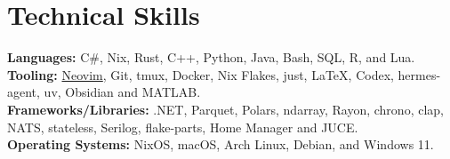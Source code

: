 \section{Technical Skills}
\begin{itemize}[leftmargin=0.15in, label={}]
    \normalsize{
    \item{
        \textbf{Languages: }{C\#, Nix, Rust, C++, Python, Java, Bash,
        SQL, R, and Lua.} \\
        \textbf{Tooling: }{\href{https://github.com/9Prestidigitator/nvim}{Neovim}, Git, tmux, Docker, Nix Flakes, just, \LaTeX, Codex, hermes-agent, uv, Obsidian and MATLAB.}\\
        \textbf{Frameworks/Libraries: }{.NET, Parquet, Polars,
          ndarray, Rayon, chrono, clap, NATS, stateless, Serilog,
        flake-parts, Home Manager and JUCE.}\\
        \textbf{Operating Systems: }{NixOS, macOS, Arch Linux,
        Debian, and Windows 11.}
    }}
\end{itemize}
